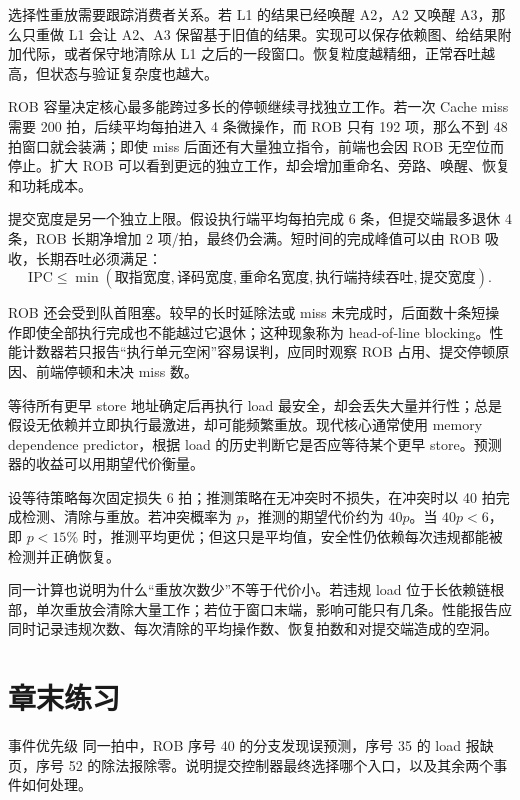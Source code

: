 选择性重放需要跟踪消费者关系。若 L1 的结果已经唤醒 A2，A2 又唤醒 A3，那么只重做 L1 会让 A2、A3 保留基于旧值的结果。实现可以保存依赖图、给结果附加代际，或者保守地清除从 L1 之后的一段窗口。恢复粒度越精细，正常吞吐越高，但状态与验证复杂度也越大。


ROB 容量决定核心最多能跨过多长的停顿继续寻找独立工作。若一次 Cache miss 需要 200 拍，后续平均每拍进入 4 条微操作，而 ROB 只有 192 项，那么不到 48 拍窗口就会装满；即使 miss 后面还有大量独立指令，前端也会因 ROB 无空位而停止。扩大 ROB 可以看到更远的独立工作，却会增加重命名、旁路、唤醒、恢复和功耗成本。

提交宽度是另一个独立上限。假设执行端平均每拍完成 6 条，但提交端最多退休 4 条，ROB 长期净增加 2 项/拍，最终仍会满。短时间的完成峰值可以由 ROB 吸收，长期吞吐必须满足：
\[
\text{IPC} \leq \min(\text{取指宽度},\text{译码宽度},\text{重命名宽度},
\text{执行端持续吞吐},\text{提交宽度}).
\]

ROB 还会受到队首阻塞。较早的长时延除法或 miss 未完成时，后面数十条短操作即使全部执行完成也不能越过它退休；这种现象称为 head-of-line blocking。性能计数器若只报告“执行单元空闲”容易误判，应同时观察 ROB 占用、提交停顿原因、前端停顿和未决 miss 数。


等待所有更早 store 地址确定后再执行 load 最安全，却会丢失大量并行性；总是假设无依赖并立即执行最激进，却可能频繁重放。现代核心通常使用 memory dependence predictor，根据 load 的历史判断它是否应等待某个更早 store。预测器的收益可以用期望代价衡量。

设等待策略每次固定损失 6 拍；推测策略在无冲突时不损失，在冲突时以 40 拍完成检测、清除与重放。若冲突概率为 $p$，推测的期望代价约为 $40p$。当 $40p<6$，即 $p<15\%$ 时，推测平均更优；但这只是平均值，安全性仍依赖每次违规都能被检测并正确恢复。

同一计算也说明为什么“重放次数少”不等于代价小。若违规 load 位于长依赖链根部，单次重放会清除大量工作；若位于窗口末端，影响可能只有几条。性能报告应同时记录违规次数、每次清除的平均操作数、恢复拍数和对提交端造成的空洞。

\section*{章末练习}

\begin{chapterexercise}{事件优先级}
同一拍中，ROB 序号 40 的分支发现误预测，序号 35 的 load 报缺页，序号 52 的除法报除零。说明提交控制器最终选择哪个入口，以及其余两个事件如何处理。
\end{chapterexercise}

